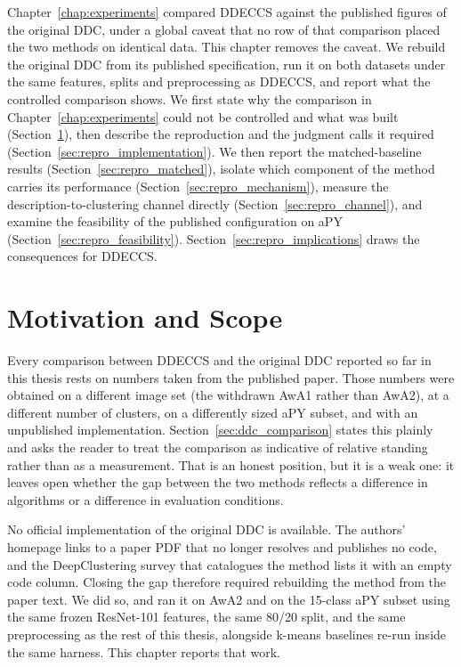 \label{chap:ddc_repro}

Chapter~\ref{chap:experiments} compared DDECCS against the published figures of the original DDC, under a global caveat that no row of that comparison placed the two methods on identical data. This chapter removes the caveat. We rebuild the original DDC from its published specification, run it on both datasets under the same features, splits and preprocessing as DDECCS, and report what the controlled comparison shows. We first state why the comparison in Chapter~\ref{chap:experiments} could not be controlled and what was built (Section~\ref{sec:repro_motivation}), then describe the reproduction and the judgment calls it required (Section~\ref{sec:repro_implementation}). We then report the matched-baseline results (Section~\ref{sec:repro_matched}), isolate which component of the method carries its performance (Section~\ref{sec:repro_mechanism}), measure the description-to-clustering channel directly (Section~\ref{sec:repro_channel}), and examine the feasibility of the published configuration on aPY (Section~\ref{sec:repro_feasibility}). Section~\ref{sec:repro_implications} draws the consequences for DDECCS.

\section{Motivation and Scope}
\label{sec:repro_motivation}

Every comparison between DDECCS and the original DDC reported so far in this thesis rests on numbers taken from the published paper. Those numbers were obtained on a different image set (the withdrawn AwA1 rather than AwA2), at a different number of clusters, on a differently sized aPY subset, and with an unpublished implementation. Section~\ref{sec:ddc_comparison} states this plainly and asks the reader to treat the comparison as indicative of relative standing rather than as a measurement. That is an honest position, but it is a weak one: it leaves open whether the gap between the two methods reflects a difference in algorithms or a difference in evaluation conditions.

No official implementation of the original DDC is available. The authors' homepage links to a paper PDF that no longer resolves and publishes no code, and the DeepClustering survey that catalogues the method lists it with an empty code column. Closing the gap therefore required rebuilding the method from the paper text. We did so, and ran it on AwA2 and on the 15-class aPY subset using the same frozen ResNet-101 features, the same 80/20 split, and the same preprocessing as the rest of this thesis, alongside k-means baselines re-run inside the same harness. This chapter reports that work.

